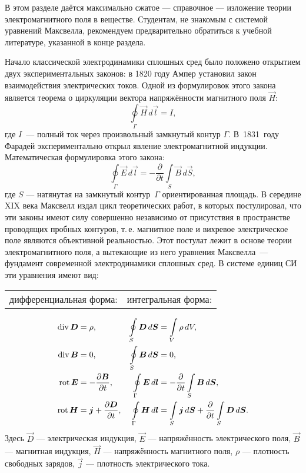 \newcommand*{\ddt}[1]{\frac{\partial #1}{\partial t}}

В этом разделе даётся максимально сжатое --- справочное --- 
изложение теории электромагнитного поля в веществе. Студентам, 
не знакомым с системой уравнений Максвелла, рекомендуем предварительно
обратиться к учебной литературе, указанной в конце раздела.


Начало классической электродинамики сплошных сред было положено открытием двух
экспериментальных законов: в 1820 году Ампер установил закон взаимодействия 
электрических токов. Одной из формулировок этого закона является теорема 
о циркуляции вектора напряжённости магнитного поля $\vec{H}$:
\[
\oint\limits_{\Gamma}\vec{H}\,d\vec{l}=I,
\]
где $I$~--- полный ток через произвольный замкнутый контур $\Gamma$. В~1831~году Фарадей 
экспериментально открыл явление электромагнитной индукции. Математическая формулировка
этого закона:
\[
\oint\limits_{\Gamma}\vec{E}\,d\vec{l}=- \frac{\partial}{\partial t} \int\limits_S \vec{B}\, d\vec{S},
\]
где $S$ --- натянутая на замкнутый контур~$\Gamma$ ориентированная площадь.
В середине XIX века Максвелл издал цикл теоретических работ, в которых постулировал, что эти законы имеют силу совершенно независимо 
от присутствия в пространстве проводящих пробных контуров, т.\,е. магнитное поле 
и вихревое электрическое поле являются объективной реальностью. 
Этот постулат лежит в основе теории электромагнитного поля, а вытекающие 
из него уравнения Максвелла~--- фундамент современной электродинамики сплошных сред. 
В системе единиц СИ эти уравнения имеют вид:
\begin{tabular}{p{4.3cm}p{5cm}}
\small дифференциальная форма: & \small интегральная форма:
\end{tabular}
\begin{align}
\Div \vec{D} &= \rho,         & 
    \oint\limits_S \vec{D}\,d\vec{S} &= \int\limits_V\rho\, dV, \eqmark{1} \\
\Div \vec{B} &= 0,            & 
    \oint\limits_S \vec{B}\,d\vec{S} &= 0, \eqmark{2} \\
\Rot \vec{E} &= -\ddt{\vec{B}}, & 
    \oint\limits_{\Gamma} \vec{E}\,d\vec{l} & = 
           - \frac{\partial}{\partial t} \int\limits_S \vec{B}\, d\vec{S}, \eqmark{3}\\
\Rot \vec{H} &= \vec{j} + \ddt{\vec{D}}, & 
    \oint\limits_{\Gamma} \vec{H}\,d\vec{l} &= \int\limits_S \vec{j}\,d\vec{S} + 
                  \frac{\partial}{\partial t} \int\limits_S \vec{D}\, d\vec{S}. \eqmark{4}
\end{align}
Здесь $\vec{D}$ --- электрическая индукция, 
$\vec{E}$ --- напряжённость электрического поля, 
$\vec{B}$ --- магнитная индукция, $\vec{H}$ --- напряжённость магнитного поля,
$\rho$ --- плотность свободных зарядов, $\vec{j}$ --- плотность электрического тока.

